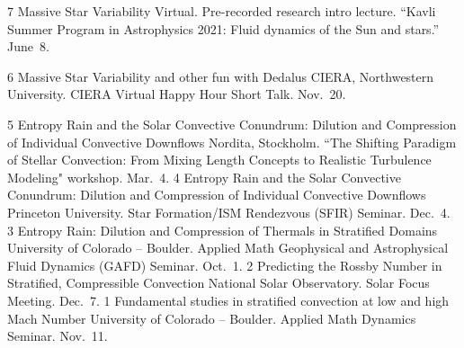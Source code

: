 \cvpub{}
	  {7}
	  {Massive Star Variability}
	  {
	  	Virtual. Pre-recorded research intro lecture. ``Kavli Summer Program in Astrophysics 2021: Fluid dynamics of the Sun and stars.'' June~8.
	  }

	  {6}
	  {Massive Star Variability and other fun with Dedalus}
	  {
	  	CIERA, Northwestern University. CIERA Virtual Happy Hour Short Talk. Nov.~20.
	  }

\cvpub{}
	  {5}
	  {Entropy Rain and the Solar Convective Conundrum: Dilution and Compression of Individual Convective Downflows}
	  {
	  	Nordita, Stockholm. ``The Shifting Paradigm of Stellar Convection: From Mixing Length Concepts to Realistic Turbulence Modeling" workshop. Mar.~4.
	  }
	  {4}
	  {Entropy Rain and the Solar Convective Conundrum: Dilution and Compression of Individual Convective Downflows}
	  {
	  	Princeton University. Star Formation/ISM Rendezvous (SFIR) Seminar. Dec.~4.
	  }
\cvpub{}
	  {3}
	  {Entropy Rain: Dilution and Compression of Thermals in Stratified Domains}
	  {
	  	University of Colorado -- Boulder. Applied Math Geophysical and Astrophysical Fluid Dynamics (GAFD) Seminar. Oct.~1.
	  }
	  {2}
	  {Predicting the Rossby Number in Stratified, Compressible Convection}
	  {
	  	National Solar Observatory. Solar Focus Meeting. Dec.~7.
	  }
      {1}
      {Fundamental studies in stratified convection at low and high Mach Number}
      {
        University of Colorado -- Boulder. Applied Math Dynamics Seminar. Nov.~11.
      }
